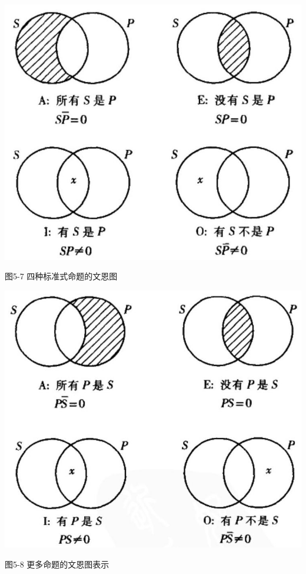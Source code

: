 \begin{center}
\includegraphics[width=\textwidth]{images/2025_05_15_6a28331d5e7c993ad07ag-260(1).jpg}

图5-7 四种标准式命题的文恩图
\end{center}

\begin{center}
\includegraphics[width=\textwidth]{images/2025_05_15_6a28331d5e7c993ad07ag-260.jpg}

图5-8 更多命题的文恩图表示
\end{center}

